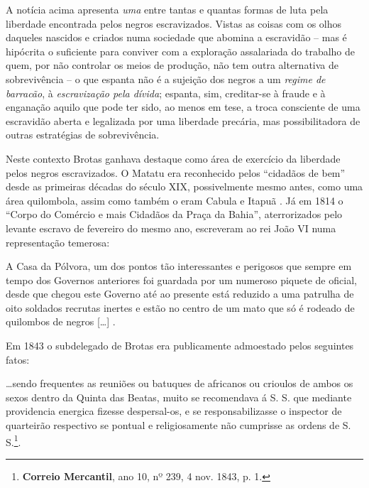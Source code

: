 A notícia acima apresenta \textit{uma} entre tantas e quantas formas de luta pela liberdade encontrada pelos negros escravizados. Vistas as coisas com os olhos daqueles nascidos e criados numa sociedade que abomina a escravidão -- mas é hipócrita o suficiente para conviver com a exploração assalariada do trabalho de quem, por não controlar os meios de produção, não tem outra alternativa de sobrevivência -- o que espanta não é a sujeição dos negros a um \textit{regime de barracão}, à \textit{escravização pela dívida}; espanta, sim, creditar-se à fraude e à enganação aquilo que pode ter sido, ao menos em tese, a troca consciente de uma escravidão aberta e legalizada por uma liberdade precária, mas possibilitadora de outras estratégias de sobrevivência.

Neste contexto Brotas ganhava destaque como área de exercício da liberdade pelos negros escravizados. O Matatu era reconhecido pelos ``cidadãos de bem'' desde as primeiras décadas do século XIX, possivelmente mesmo antes, como uma área quilombola, assim como também o eram Cabula e Itapuã \cite[p.~377]{schwartz_1814_1996}. Já em 1814 o ``Corpo do Comércio e mais Cidadãos da Praça da Bahia'', aterrorizados pelo levante escravo de fevereiro do mesmo ano, escreveram ao rei João VI numa representação temerosa:

\begin{citacao}
A Casa da Pólvora, um dos pontos tão interessantes e perigosos que sempre em tempo dos Governos anteriores foi guardada por um numeroso piquete de oficial, desde que chegou este Governo até ao presente está reduzido a uma patrulha de oito soldados recrutas inertes e estão no centro de um mato que só é rodeado de quilombos de negros [\dots] \cite[pp.~103-106]{ott_formaet2_1957}.
\end{citacao}

Em 1843 o subdelegado de Brotas era publicamente admoestado pelos seguintes fatos:

\begin{citacao}
\dots sendo frequentes as reuniões ou batuques de africanos ou crioulos de ambos os sexos dentro da Quinta das Beatas, muito se recomendava á S. S. que mediante providencia energica fizesse despersal-os, e se responsabilizasse o inspector de quarteirão respectivo se pontual e religiosamente não cumprisse as ordens de S. S.\footnote{\textbf{Correio Mercantil}, ano 10, nº 239, 4 nov. 1843, p. 1.}.
\end{citacao}

